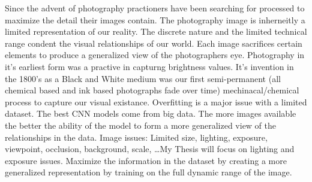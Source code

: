 % 
% 
%
Since the advent of photography practioners have been searching for processed to maximize the detail their images contain.  The photography image is inherneitly a limited representation of our reality.  The discrete nature and the limited technical range condent the visual relationships of our world. Each image sacrifices certain elements to produce a generalized view of the photographers eye.  Photography in it's earliest form was a practive in capturng brightness values.  It's invention in the 1800's as a Black and White medium was our first semi-permanent (all chemical based and ink based photographs fade over time) mechinacal/chemical process to capture our visual existance. Overfitting is a major issue with a limited dataset.  The best CNN models come from big data.  The more images available the better the ability of the model to form a more generalized view of the relationships in the data.  Image issues: Limited size, lighting, exposure, viewpoint, occlusion, background, scale, \dots My Thesis will focus on lighting and exposure issues. Maximize the information in the dataset by creating a more generalized representation by training on the full dynamic range of the image.  